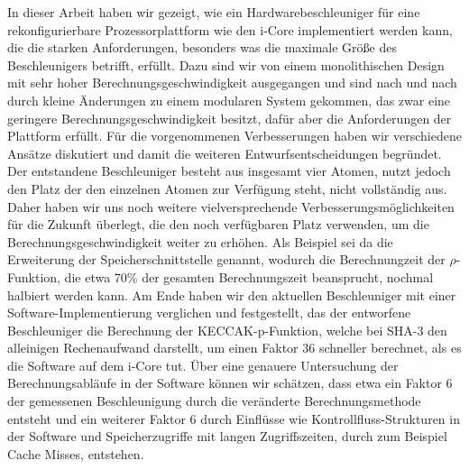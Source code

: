 In dieser Arbeit haben wir gezeigt, wie ein Hardwarebeschleuniger für eine rekonfigurierbare Prozessorplattform
wie den i-Core implementiert werden kann, die die starken Anforderungen, besonders was die maximale Größe des Beschleunigers betrifft, erfüllt.
Dazu sind wir von einem monolithischen Design mit sehr hoher Berechnungsgeschwindigkeit ausgegangen und sind
nach und nach durch kleine Änderungen zu einem modularen System gekommen, das zwar eine geringere
Berechnungsgeschwindigkeit besitzt, dafür aber die Anforderungen der Plattform erfüllt.
Für die vorgenommenen Verbesserungen haben wir verschiedene Ansätze diskutiert und damit die weiteren
Entwurfsentscheidungen begründet. Der entstandene Beschleuniger besteht aus insgesamt vier Atomen,
nutzt jedoch den Platz der den einzelnen Atomen zur Verfügung steht, nicht vollständig aus.
Daher haben wir uns noch weitere vielversprechende Verbesserungsmöglichkeiten für die Zukunft überlegt,
die den noch verfügbaren Platz verwenden, um die Berechnungsgeschwindigkeit weiter zu erhöhen.
Als Beispiel sei da die Erweiterung der Speicherschnittstelle genannt, wodurch die Berechnungzeit der
$\rho$-Funktion, die etwa 70\% der gesamten Berechnungszeit beansprucht, nochmal halbiert werden kann.
Am Ende haben wir den aktuellen Beschleuniger mit einer Software-Implementierung verglichen und festgestellt,
das der entworfene Beschleuniger die Berechnung der KECCAK-p-Funktion, welche bei SHA-3 den alleinigen Rechenaufwand darstellt,
um einen Faktor 36 schneller berechnet, als es die Software auf dem i-Core tut. Über eine genauere Untersuchung
der Berechnungsabläufe in der Software können wir schätzen, dass etwa ein Faktor 6 der gemessenen Beschleunigung
durch die veränderte Berechnungsmethode entsteht und ein weiterer Faktor 6 durch Einflüsse wie Kontrollfluss-Strukturen
in der Software und Speicherzugriffe mit langen Zugriffszeiten, durch zum Beispiel Cache Misses, entstehen.